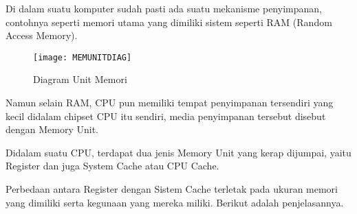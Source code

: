 Di dalam suatu komputer sudah pasti ada suatu mekanisme penyimpanan, contohnya
seperti memori utama yang dimiliki sistem seperti RAM (Random Access Memory).

\begin{figure}[h]
    \centering
    \texttt{[image: MEMUNITDIAG]}
    \caption{Diagram Unit Memori}
    \label{fig:MEMUNITDIAG}
\end{figure}

Namun selain RAM, CPU pun memiliki tempat penyimpanan tersendiri yang kecil didalam
chipset CPU itu sendiri, media penyimpanan tersebut disebut dengan Memory Unit.

Didalam suatu CPU, terdapat dua jenis Memory Unit yang kerap dijumpai,
yaitu Register dan juga System Cache atau CPU Cache.

Perbedaan antara Register dengan Sistem Cache terletak pada ukuran memori yang
dimiliki serta kegunaan yang mereka miliki. Berikut adalah penjelasannya.

